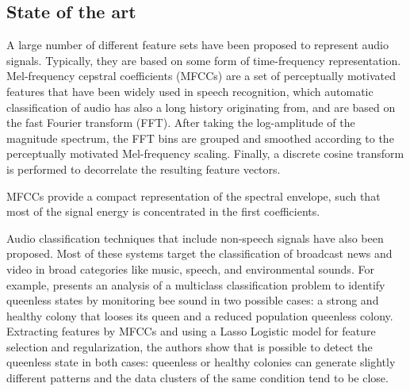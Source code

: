 \documentclass[english, LaM, oneside, noexaminfo]{sapthesis}
\begin{document}



\subsection{State of the art}

A large number of different feature sets have been proposed to represent audio signals. Typically, they are based on some form of time-frequency representation. Mel-frequency cepstral coefficients (MFCCs) are a set of perceptually motivated features that have been widely used in speech recognition, which automatic classification of audio has also a long history originating from, and are based on the fast Fourier transform (FFT). After taking the log-amplitude of the magnitude spectrum, the FFT bins are grouped and smoothed according to the perceptually motivated Mel-frequency scaling. Finally, a discrete cosine transform is performed to decorrelate the resulting feature vectors. 

MFCCs provide a compact representation of the spectral envelope, such that most of the signal energy is concentrated in the first coefficients. 

Audio classification techniques that include non-speech signals have also been proposed. Most of these systems target the classification of broadcast news and video in broad categories like music, speech, and environmental sounds. For example, \cite{ROBLESGUERRERO201969} presents an analysis of a multiclass classification problem to identify queenless states by monitoring bee sound in two possible cases: a strong and healthy colony that looses its queen and a reduced population queenless colony. Extracting features by MFCCs and using a Lasso Logistic model for feature selection and regularization, the authors show that is possible to detect the queenless state in both cases: queenless or healthy colonies can generate slightly different patterns and the data clusters of the same condition tend to be close.
\end{document}
